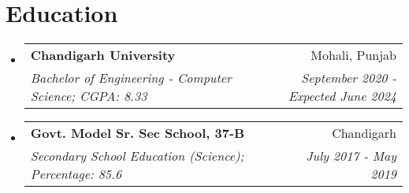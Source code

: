 \documentclass[apaper,20pt]{article}
\makeatletter
\newcommand{\resumeSubheading}[4]{
  \vspace{-1pt}\item
    \begin{tabular*}{0.97\textwidth}{l@{\extracolsep{\fill}}r}
      \textbf{#1} & #2 \\
      \textit{#3} & \textit{#4} \\
    \end{tabular*}\vspace{-5pt}
}
\newcommand{\resumeSubHeadingListStart}{\begin{itemize}[leftmargin=*]}
\newcommand{\resumeSubHeadingListEnd}{\end{itemize}}
\makeatother
\begin{document}

\vspace{-6pt}

\section{Education}
\resumeSubHeadingListStart
\resumeSubheading
{Chandigarh University}{Mohali, Punjab}
{Bachelor of Engineering - Computer Science;  CGPA: 8.33}{September 2020 - Expected June 2024}
\vspace{0pt}
\resumeSubheading
{Govt. Model Sr. Sec School, 37-B}{Chandigarh}
{Secondary School Education (Science);  Percentage: 85.6}{July 2017 - May 2019}
\resumeSubHeadingListEnd
\end{document}

